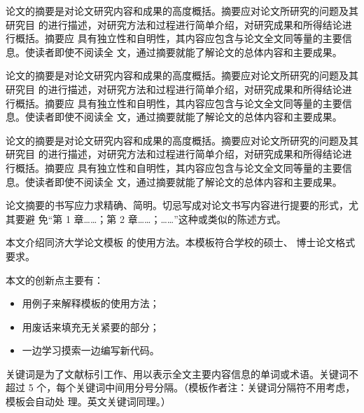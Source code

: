 \begin{cabstract}
  论文的摘要是对论文研究内容和成果的高度概括。摘要应对论文所研究的问题及其研究目
  的进行描述，对研究方法和过程进行简单介绍，对研究成果和所得结论进行概括。摘要应
  具有独立性和自明性，其内容应包含与论文全文同等量的主要信息。使读者即使不阅读全
  文，通过摘要就能了解论文的总体内容和主要成果。



  论文的摘要是对论文研究内容和成果的高度概括。摘要应对论文所研究的问题及其研究目
  的进行描述，对研究方法和过程进行简单介绍，对研究成果和所得结论进行概括。摘要应
  具有独立性和自明性，其内容应包含与论文全文同等量的主要信息。使读者即使不阅读全
  文，通过摘要就能了解论文的总体内容和主要成果。

  
  论文的摘要是对论文研究内容和成果的高度概括。摘要应对论文所研究的问题及其研究目
  的进行描述，对研究方法和过程进行简单介绍，对研究成果和所得结论进行概括。摘要应
  具有独立性和自明性，其内容应包含与论文全文同等量的主要信息。使读者即使不阅读全
  文，通过摘要就能了解论文的总体内容和主要成果。

  论文摘要的书写应力求精确、简明。切忌写成对论文书写内容进行提要的形式，尤其要避
  免“第 1 章……；第 2 章……；……”这种或类似的陈述方式。

  本文介绍同济大学论文模板 \tongjithesis{} 的使用方法。本模板符合学校的硕士、
  博士论文格式要求。

  本文的创新点主要有：
  \begin{itemize}
    \item 用例子来解释模板的使用方法；
    \item 用废话来填充无关紧要的部分；
    \item 一边学习摸索一边编写新代码。
  \end{itemize}

  关键词是为了文献标引工作、用以表示全文主要内容信息的单词或术语。关键词不超过 5
  个，每个关键词中间用分号分隔。（模板作者注：关键词分隔符不用考虑，模板会自动处
  理。英文关键词同理。）
\end{cabstract}


